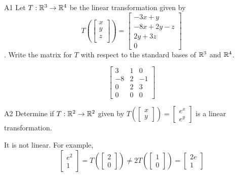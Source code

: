 \documentclass{sbgLAquiz}
\begin{document}
\begin{problem}{A1}
Let $T: \mathbb{R}^3\rightarrow \mathbb{R}^4$ be the linear transformation given by $$T\left(\begin{bmatrix} x \\ y \\ z \\  \end{bmatrix} \right) = \begin{bmatrix} -3x+y \\ -8x+2y-z \\ 2y+3z \\ 0 \end{bmatrix}$$.  Write the matrix for $T$ with respect to the standard bases of $\mathbb{R}^3$ and $\mathbb{R}^4$.
\end{problem}
\begin{solution}
$$\begin{bmatrix} 3 & 1 & 0 \\ -8 & 2 & -1 \\ 0 & 2 & 3 \\ 0 & 0 & 0 \end{bmatrix}$$
\end{solution}


\begin{extract}\newpage\end{extract}
\begin{problem}{A2} 
 Determine if $T: \mathbb{R}^2 \rightarrow \mathbb{R}^2$ given by $T\left(\begin{bmatrix} x \\ y \end{bmatrix}\right) = \begin{bmatrix} e^{x} \\ e^y \end{bmatrix}$ is a linear transformation.
\end{problem}
\begin{solution}
It is not linear.  For example, $$\begin{bmatrix}e^2 \\ 1 \end{bmatrix} = T\left(\begin{bmatrix} 2 \\ 0 \end{bmatrix} \right) \neq 2 T\left(\begin{bmatrix} 1 \\ 0 \end{bmatrix}\right)=\begin{bmatrix} 2e \\ 1 \end{bmatrix}$$
\end{solution}
\end{document}
